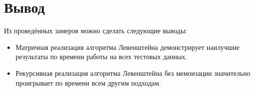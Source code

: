\clearpage

\section{Вывод}

Из проведённых замеров можно сделать следующие выводы:
\begin{itemize}
	\item{Матричная реализация алгоритма Левенштейна демонстрирует наилучшие результаты по времени работы на всех тестовых данных.}
	\item{Рекурсивная реализация алгоритма Левенштейна без мемоизации значительно проигрывает по времени всем другим подходам.}
\end{itemize}

\clearpage
